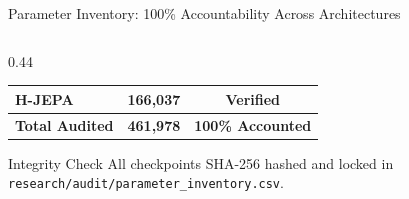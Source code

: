 \documentclass[aspectratio=169, 10pt]{beamer}
\begin{document}
\begin{frame}{Parameter Inventory: 100\% Accountability Across Architectures}
\begin{columns}
\begin{column}{0.44\textwidth}
\begin{tabular}{lcc}
        H-JEPA & 166,037 & Verified \\
        \midrule
        \textbf{Total Audited} & \textbf{461,978} & \textbf{100\% Accounted} \\
        \bottomrule
      \end{tabular}
      \vspace{0.8em}
      \begin{alertblock}{Integrity Check}
        All checkpoints SHA-256 hashed and locked in \texttt{research/audit/parameter\_inventory.csv}.
      \end{alertblock}
    \end{column}
  \end{columns}
\end{frame}

\end{document}
